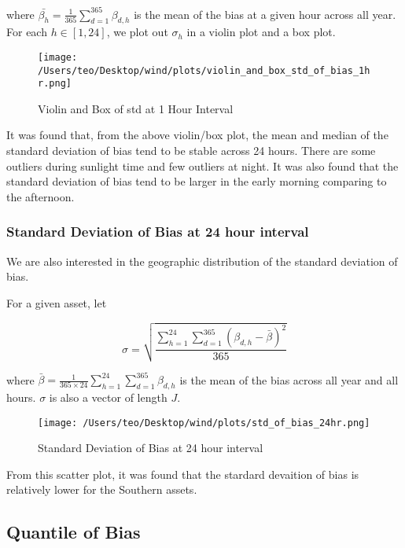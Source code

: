 \documentclass[
]{article}
\begin{document}
where \(\bar{\beta_h} = \frac{1}{365}\sum_{d = 1}^{365} \beta_{d,h}\) is
the mean of the bias at a given hour across all year. For each
\(h \in [1,24]\), we plot out \(\sigma_h\) in a violin plot and a box
plot.

\begin{figure}
\centering
\texttt{[image: /Users/teo/Desktop/wind/plots/violin\_and\_box\_std\_of\_bias\_1hr.png]}
\caption{Violin and Box of std at 1 Hour Interval}
\end{figure}

It was found that, from the above violin/box plot, the mean and median
of the standard deviation of bias tend to be stable across 24 hours.
There are some outliers during sunlight time and few outliers at night.
It was also found that the standard deviation of bias tend to be larger
in the early morning comparing to the afternoon.

\hypertarget{standard-deviation-of-bias-at-24-hour-interval}{%
\subsubsection{Standard Deviation of Bias at 24 hour
interval}\label{standard-deviation-of-bias-at-24-hour-interval}}

We are also interested in the geographic distribution of the standard
deviation of bias.

For a given asset, let

\[\sigma=\sqrt{\frac{\sum_{h = 1}^{24}\sum_{d = 1}^{365}\left(\beta_{d,h}-\bar{\beta}\right)^{2}}{365}}\]

where
\(\bar{\beta} = \frac{1}{365\times 24}\sum_{h = 1}^{24}\sum_{d = 1}^{365} \beta_{d,h}\)
is the mean of the bias across all year and all hours. \(\sigma\) is
also a vector of length \(J\).

\begin{figure}
\centering
\texttt{[image: /Users/teo/Desktop/wind/plots/std\_of\_bias\_24hr.png]}
\caption{Standard Deviation of Bias at 24 hour
interval}
\end{figure}

From this scatter plot, it was found that the stardard devaition of bias
is relatively lower for the Southern assets.

\hypertarget{quantile-of-bias}{%
\subsection{Quantile of Bias}\label{quantile-of-bias}}
\end{document}
